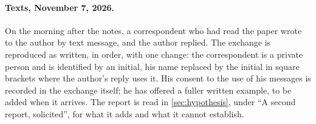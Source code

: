 
\paragraph{Texts, November 7, 2026.}\label{app:texts} On the morning after the notes, a correspondent who had read the paper wrote to the author by text message, and the author replied. The exchange is reproduced as written, in order, with one change: the correspondent is a private person and is identified by an initial, his name replaced by the initial in square brackets where the author's reply uses it. His consent to the use of his messages is recorded in the exchange itself; he has offered a fuller written example, to be added when it arrives. The report is read in \autoref{sec:hypothesis}, under ``A second report, solicited'', for what it adds and what it cannot establish.
